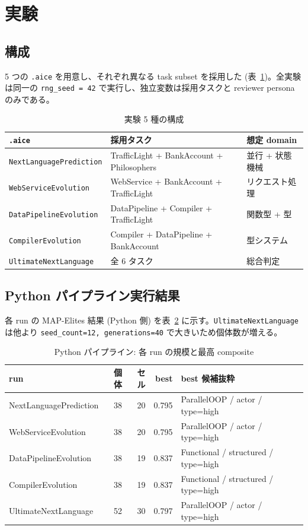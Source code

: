 \documentclass[a4paper,11pt]{article}
\begin{document}
\section{実験}

\subsection{構成}

5 つの \texttt{.aice} を用意し、それぞれ異なる task subset を採用した
(表~\ref{tab:experiments})。全実験は同一の \texttt{rng\_seed = 42}
で実行し、独立変数は採用タスクと reviewer persona のみである。

\begin{table}[h]
\centering
\caption{実験 5 種の構成}
\label{tab:experiments}
\footnotesize
\begin{tabularx}{\linewidth}{lXl}
\toprule
\texttt{.aice} & 採用タスク & 想定 domain \\
\midrule
\texttt{NextLanguagePrediction} & TrafficLight + BankAccount + Philosophers & 並行 + 状態機械 \\
\texttt{WebServiceEvolution}    & WebService + BankAccount + TrafficLight   & リクエスト処理 \\
\texttt{DataPipelineEvolution}  & DataPipeline + Compiler + TrafficLight    & 関数型 + 型 \\
\texttt{CompilerEvolution}      & Compiler + DataPipeline + BankAccount     & 型システム \\
\texttt{UltimateNextLanguage}   & 全 6 タスク                                & 総合判定 \\
\bottomrule
\end{tabularx}
\end{table}

\subsection{Python パイプライン実行結果}

各 run の MAP-Elites 結果 (Python 側) を表~\ref{tab:python_results}
に示す。\texttt{UltimateNextLanguage} は他より \texttt{seed\_count=12,
generations=40} で大きいため個体数が増える。

\begin{table}[h]
\centering
\caption{Python パイプライン: 各 run の規模と最高 composite}
\label{tab:python_results}
\small
\begin{tabular}{lrrrl}
\toprule
run & 個体 & セル & best & best 候補抜粋 \\
\midrule
NextLanguagePrediction & 38 & 20 & 0.795 & ParallelOOP / actor / type=high \\
WebServiceEvolution    & 38 & 20 & 0.795 & ParallelOOP / actor / type=high \\
DataPipelineEvolution  & 38 & 19 & 0.837 & Functional / structured / type=high \\
CompilerEvolution      & 38 & 19 & 0.837 & Functional / structured / type=high \\
UltimateNextLanguage   & 52 & 30 & 0.797 & ParallelOOP / actor / type=high \\
\bottomrule
\end{tabular}
\end{table}
\end{document}
